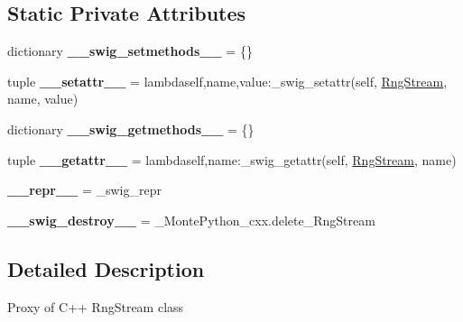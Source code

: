 \subsection*{Static Private Attributes}
\begin{DoxyCompactItemize}
\item 
\hypertarget{classMontePython__cxx_1_1RngStream_a86c8441435239e0dd75db61b980bb958}{}dictionary {\bfseries \+\_\+\+\_\+swig\+\_\+setmethods\+\_\+\+\_\+} = \{\}\label{classMontePython__cxx_1_1RngStream_a86c8441435239e0dd75db61b980bb958}

\item 
\hypertarget{classMontePython__cxx_1_1RngStream_a0894489ef1c8156f4d976d822f3e5934}{}tuple {\bfseries \+\_\+\+\_\+setattr\+\_\+\+\_\+} = lambdaself,name,value\+:\+\_\+swig\+\_\+setattr(self, \hyperlink{classMontePython__cxx_1_1RngStream}{Rng\+Stream}, name, value)\label{classMontePython__cxx_1_1RngStream_a0894489ef1c8156f4d976d822f3e5934}

\item 
\hypertarget{classMontePython__cxx_1_1RngStream_aff6deb5ba68d4de6671b73a094645c3d}{}dictionary {\bfseries \+\_\+\+\_\+swig\+\_\+getmethods\+\_\+\+\_\+} = \{\}\label{classMontePython__cxx_1_1RngStream_aff6deb5ba68d4de6671b73a094645c3d}

\item 
\hypertarget{classMontePython__cxx_1_1RngStream_a0b48457a7c6dfa3299de868618dfe415}{}tuple {\bfseries \+\_\+\+\_\+getattr\+\_\+\+\_\+} = lambdaself,name\+:\+\_\+swig\+\_\+getattr(self, \hyperlink{classMontePython__cxx_1_1RngStream}{Rng\+Stream}, name)\label{classMontePython__cxx_1_1RngStream_a0b48457a7c6dfa3299de868618dfe415}

\item 
\hypertarget{classMontePython__cxx_1_1RngStream_a46cbff08b6e54db55e52bc788876499a}{}{\bfseries \+\_\+\+\_\+repr\+\_\+\+\_\+} = \+\_\+swig\+\_\+repr\label{classMontePython__cxx_1_1RngStream_a46cbff08b6e54db55e52bc788876499a}

\item 
\hypertarget{classMontePython__cxx_1_1RngStream_ad8a36cf00e035bd737554061784bdc00}{}{\bfseries \+\_\+\+\_\+swig\+\_\+destroy\+\_\+\+\_\+} = \+\_\+\+Monte\+Python\+\_\+cxx.\+delete\+\_\+\+Rng\+Stream\label{classMontePython__cxx_1_1RngStream_ad8a36cf00e035bd737554061784bdc00}

\end{DoxyCompactItemize}


\subsection{Detailed Description}
\begin{DoxyVerb}Proxy of C++ RngStream class\end{DoxyVerb}
 

